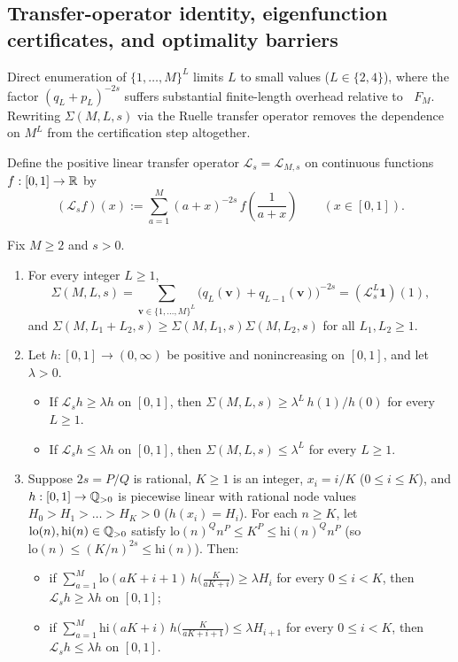 \documentclass[11pt]{article}
\newcommand{\ind}{\mathbf{1}}
\newcommand{\Lop}{\mathcal{L}}
\DeclareMathOperator{\dimH}{\dim_{\mathrm{H}}}
\begin{document}
\subsection{Transfer-operator identity, eigenfunction certificates, and optimality barriers}

Direct enumeration of $\{1,\dots,M\}^L$ limits $L$ to small values ($L\in\{2,4\}$), where the factor $(q_L+p_L)^{-2s}$ suffers substantial finite-length overhead relative to $\dimH F_M$. Rewriting $\Sigma(M,L,s)$ via the Ruelle transfer operator removes the dependence on $M^L$ from the certification step altogether.

Define the positive linear transfer operator $\Lop_s=\Lop_{M,s}$ on continuous functions $f:[0,1]\to\mathbb R$ by
\begin{equation}\label{eq:transfer-op}
(\Lop_s f)(x):=\sum_{a=1}^M (a+x)^{-2s}\,f\!\left(\frac1{a+x}\right)\qquad(x\in[0,1]).
\end{equation}

\begin{lemma}\label{lem:transfer-id}
Fix $M\ge2$ and $s>0$.
\begin{enumerate}[label=\textup{(\arabic*)},nosep]
\item For every integer $L\ge1$,
\begin{equation}\label{eq:transfer-id}
\Sigma(M,L,s)=\sum_{\mathbf{v}\in\{1,\dots,M\}^L}\bigl(q_L(\mathbf{v})+q_{L-1}(\mathbf{v})\bigr)^{-2s}=(\Lop_s^L\ind)(1),
\end{equation}
and $\Sigma(M,L_1+L_2,s)\ge\Sigma(M,L_1,s)\Sigma(M,L_2,s)$ for all $L_1,L_2\ge1$.
\item Let $h:[0,1]\to(0,\infty)$ be positive and nonincreasing on $[0,1]$, and let $\lambda>0$.
\begin{itemize}[nosep]
\item If $\Lop_s h\ge\lambda h$ on $[0,1]$, then $\Sigma(M,L,s)\ge\lambda^L\,h(1)/h(0)$ for every $L\ge1$.
\item If $\Lop_s h\le\lambda h$ on $[0,1]$, then $\Sigma(M,L,s)\le\lambda^L$ for every $L\ge1$.
\end{itemize}
\item Suppose $2s=P/Q$ is rational, $K\ge1$ is an integer, $x_i=i/K$ ($0\le i\le K$), and $h:[0,1]\to\mathbb Q_{>0}$ is piecewise linear with rational node values $H_0>H_1>\dots>H_K>0$ ($h(x_i)=H_i$). For each $n\ge K$, let $\mathrm{lo}(n),\mathrm{hi}(n)\in\mathbb Q_{>0}$ satisfy $\mathrm{lo}(n)^Qn^P\le K^P\le\mathrm{hi}(n)^Qn^P$ (so $\mathrm{lo}(n)\le(K/n)^{2s}\le\mathrm{hi}(n)$). Then:
\begin{itemize}[nosep]
\item if $\sum_{a=1}^M\mathrm{lo}(aK+i+1)\,h\bigl(\frac{K}{aK+i}\bigr)\ge\lambda H_i$ for every $0\le i<K$, then $\Lop_s h\ge\lambda h$ on $[0,1]$;
\item if $\sum_{a=1}^M\mathrm{hi}(aK+i)\,h\bigl(\frac{K}{aK+i+1}\bigr)\le\lambda H_{i+1}$ for every $0\le i<K$, then $\Lop_s h\le\lambda h$ on $[0,1]$.
\end{itemize}
\end{enumerate}
\end{lemma}
\end{document}
